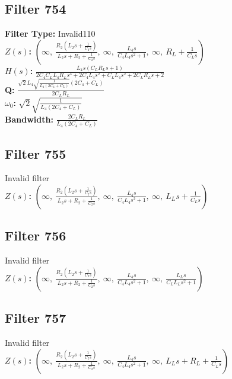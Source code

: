 \documentclass{article}
\begin{document}
\subsection*{Filter 754}
\textbf{Filter Type:} Invalid110 \\ 
\textbf{$Z(s)$:} $\left( \infty, \  \frac{R_{2} \left(L_{2} s + \frac{1}{C_{2} s}\right)}{L_{2} s + R_{2} + \frac{1}{C_{2} s}}, \  \infty, \  \frac{L_{4} s}{C_{4} L_{4} s^{2} + 1}, \  \infty, \  R_{L} + \frac{1}{C_{L} s}\right)$ \\ 
\textbf{$H(s)$:} $\frac{L_{4} s \left(C_{L} R_{L} s + 1\right)}{2 C_{4} C_{L} L_{4} R_{L} s^{3} + 2 C_{4} L_{4} s^{2} + C_{L} L_{4} s^{2} + 2 C_{L} R_{L} s + 2}$ \\ 
\textbf{Q:} $\frac{\sqrt{2} L_{4} \sqrt{\frac{1}{L_{4} \left(2 C_{4} + C_{L}\right)}} \left(2 C_{4} + C_{L}\right)}{2 C_{L} R_{L}}$ \\ 
\textbf{$\omega_0$:} $\sqrt{2} \sqrt{\frac{1}{L_{4} \left(2 C_{4} + C_{L}\right)}}$ \\ 
\textbf{Bandwidth:} $\frac{2 C_{L} R_{L}}{L_{4} \left(2 C_{4} + C_{L}\right)}$ \\ 
\subsection*{Filter 755}
Invalid filter \\ 
\textbf{$Z(s)$:} $\left( \infty, \  \frac{R_{2} \left(L_{2} s + \frac{1}{C_{2} s}\right)}{L_{2} s + R_{2} + \frac{1}{C_{2} s}}, \  \infty, \  \frac{L_{4} s}{C_{4} L_{4} s^{2} + 1}, \  \infty, \  L_{L} s + \frac{1}{C_{L} s}\right)$ \\ 
\subsection*{Filter 756}
Invalid filter \\ 
\textbf{$Z(s)$:} $\left( \infty, \  \frac{R_{2} \left(L_{2} s + \frac{1}{C_{2} s}\right)}{L_{2} s + R_{2} + \frac{1}{C_{2} s}}, \  \infty, \  \frac{L_{4} s}{C_{4} L_{4} s^{2} + 1}, \  \infty, \  \frac{L_{L} s}{C_{L} L_{L} s^{2} + 1}\right)$ \\ 
\subsection*{Filter 757}
Invalid filter \\ 
\textbf{$Z(s)$:} $\left( \infty, \  \frac{R_{2} \left(L_{2} s + \frac{1}{C_{2} s}\right)}{L_{2} s + R_{2} + \frac{1}{C_{2} s}}, \  \infty, \  \frac{L_{4} s}{C_{4} L_{4} s^{2} + 1}, \  \infty, \  L_{L} s + R_{L} + \frac{1}{C_{L} s}\right)$ \\ 
\end{document}
